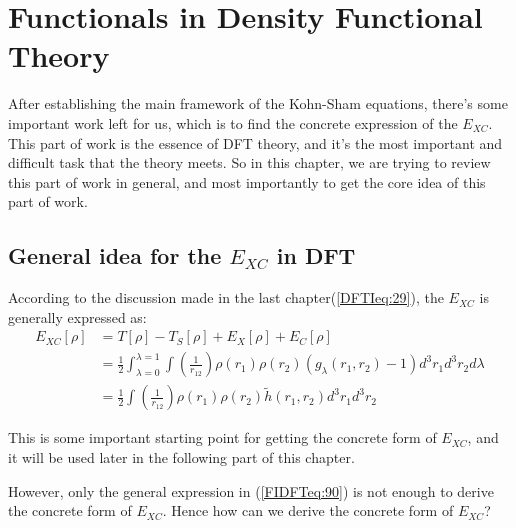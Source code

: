%
%

\chapter{Functionals in Density Functional Theory}
\label{Functionals_in_DFT}

After establishing the main framework of the Kohn-Sham equations,
there's some important work left for us, which is to find the concrete
expression of the $E_{XC}$. This part of work is the essence of DFT
theory, and it's the most important and difficult task that the theory
meets. So in this chapter, we are trying to review this part of work
in general, and most importantly to get the core idea of this part of
work.



\section{General idea for the $E_{XC}$ in DFT}
%
%
%
%
According to the discussion made in the last chapter(\ref{DFTIeq:29}), the
$E_{XC}$ is generally expressed as:
\begin{align}
  \label{FIDFTeq:90}
  E_{XC}[\rho] &= T[\rho] - T_{S}[\rho] + E_{X}[\rho] + E_{C}[\rho]
\nonumber \\
&=
\frac{1}{2}\int^{\lambda = 1}_{\lambda = 0} \int
\left(\frac{1}{r_{12}}\right)
\rho(r_{1})\rho(r_{2})(g_{\lambda}(r_{1},
r_{2})-1)d^{3}r_{1}d^{3}r_{2} d\lambda \nonumber \\
&=\frac{1}{2} \int \left(\frac{1}{r_{12}}\right)
\rho(r_{1})\rho(r_{2})\widetilde{h}(r_{1},
r_{2})d^{3}r_{1}d^{3}r_{2}
\end{align}


This is some important starting point for getting the concrete form
of $E_{XC}$, and it will be used later in the following part of this
chapter.

However, only the general expression in (\ref{FIDFTeq:90}) is not
enough to derive the concrete form of $E_{XC}$. Hence how can we
derive the concrete form of $E_{XC}$?

